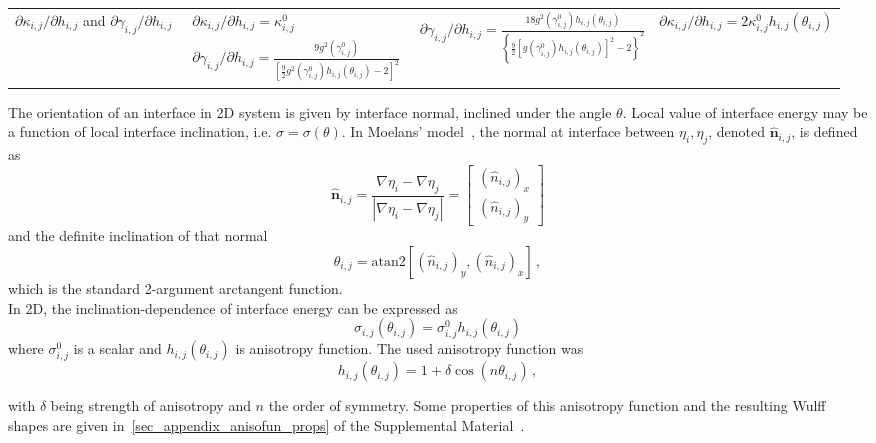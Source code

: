 \begin{table*}[]
\begin{tabular}{p{2cm}|>{\centering\arraybackslash}p{4cm}>{\centering\arraybackslash}p{4.3cm}>{\centering\arraybackslash}p{3.5cm}}
		$\partial \kappa_{i,j}/\partial h_{i,j}$ and $\partial \gamma_{i,j}/\partial h_{i
			,j}$ 
		& $\begin{array}{l}
			\partial \kappa_{i,j}/\partial h_{i,j} = \kappa_{i,j}^0 \\
			\partial \gamma_{i,j}/\partial h_{i,j} = \frac{9g^2( \gamma_{i,j}^0)}{\left[\frac{9}{2}g^2(\gamma_{i,j}^0)h_{i,j}(\theta_{i,j}) - 2\right]^2}
		\end{array}$ 
		& $\partial \gamma_{i,j}/\partial h_{i,j} = \frac{18g^2(\gamma_{i,j}^0)h_{i,j}(\theta_{i,j})}{\left\{\frac{9}{2}[g(\gamma_{i,j}^0)h_{i,j}(\theta_{i,j})]^2 - 2\right\}^2}$ 
		& $\partial \kappa_{i,j}/\partial h_{i,j} = 2 \kappa_{i,j}^0h_{i,j}(\theta_{i,j})$
	\end{tabular}
\end{table*}
The orientation of an interface in 2D system is given by interface normal, inclined under the angle $\theta$. Local value of interface energy may be a function of local interface inclination, i.e. $\sigma = \sigma(\theta)$. In Moelans' model~\cite{Moelans2008}, the normal at interface between $\eta_i,\eta_j$, denoted $\hat{\bm{n}}_{i,j}$, is defined as 
\begin{equation}
	\hat{\bm{n}}_{i,j} = \frac{\nabla\eta_i-\nabla\eta_j}{|\nabla\eta_i-\nabla\eta_j|} = \left[\begin{array}{c}
		(\hat{n}_{i,j})_x   \\
		(\hat{n}_{i,j})_y
	\end{array} \right]
\end{equation}
and the definite inclination of that normal 
\begin{equation}
	\theta_{i,j} = \mathrm{atan2}[(\hat{n}_{i,j})_y,(\hat{n}_{i,j})_x] \,,
\end{equation}
which is the standard 2-argument arctangent function.\\
In 2D, the inclination-dependence of interface energy can be expressed as 
\begin{equation}\label{eq_IE_incldep}
	\sigma_{i,j}(\theta_{i,j}) = \sigma_{i,j}^0h_{i,j}(\theta_{i,j})
\end{equation}
where $\sigma_{i,j}^0$ is a scalar and  $h_{i,j}(\theta_{i,j})$ is anisotropy function. The used anisotropy function was
\begin{equation}
	h_{i,j}(\theta_{i,j}) = 1 + \delta\cos(n\theta_{i,j}) \,,
\end{equation}

with $\delta$ being strength of anisotropy and $n$ the order of symmetry. Some properties of this anisotropy function and the resulting Wulff shapes are given in~\ref{sec_appendix_anisofun_props} of the Supplemental Material~\cite{Minar2021suppl}. 

